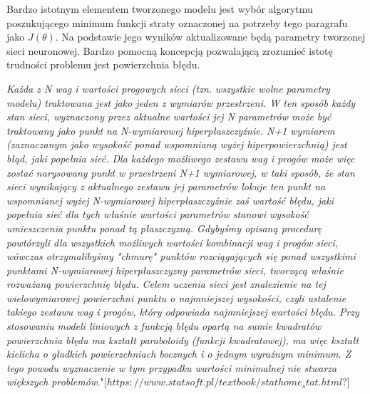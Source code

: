 \documentclass[]{article}
\theoremstyle{definition}
\begin{document}

Bardzo istotnym elementem tworzonego modelu jest wybór algorytmu poszukującego minimum funkcji straty oznaczonej na potrzeby tego paragrafu jako $J(\theta)$. Na podstawie jego wyników aktualizowane będą parametry tworzonej sieci neuronowej. Bardzo pomocną koncepcją pozwalającą zrozumieć istotę trudności problemu jest powierzchnia błędu.

\textit{Każda z N wag i wartości progowych sieci (tzn. wszystkie wolne parametry modelu) traktowana jest jako jeden z wymiarów przestrzeni. W ten sposób każdy stan sieci, wyznaczony przez aktualne wartości jej N parametrów może być traktowany jako punkt na N-wymiarowej hiperpłaszczyźnie. N+1 wymiarem (zaznaczanym jako wysokość ponad wspomnianą wyżej hiperpowierzchnią) jest błąd, jaki popełnia sieć. Dla każdego możliwego zestawu wag i progów może więc zostać narysowany punkt w przestrzeni N+1 wymiarowej, w taki sposób, że stan sieci wynikający z aktualnego zestawu jej parametrów lokuje ten punkt na wspomnianej wyżej N-wymiarowej hiperpłaszczyźnie zaś wartość błędu, jaki popełnia sieć dla tych właśnie wartości parametrów stanowi wysokość umieszczenia punktu ponad tą płaszczyzną. Gdybyśmy opisaną procedurę powtórzyli dla wszystkich możliwych wartości kombinacji wag i progów sieci, wówczas otrzymalibyśmy "chmurę" punktów rozciągających się ponad wszystkimi punktami N-wymiarowej hiperpłaszczyzny parametrów sieci, tworzącą właśnie rozważaną powierzchnię błędu. Celem uczenia sieci jest znalezienie na tej wielowymiarowej powierzchni punktu o najmniejszej wysokości, czyli ustalenie takiego zestawu wag i progów, który odpowiada najmniejszej wartości błędu.
Przy stosowaniu modeli liniowych z funkcją błędu opartą na sumie kwadratów powierzchnia błędu ma kształt paraboloidy (funkcji kwadratowej), ma więc kształt kielicha o gładkich powierzchniach bocznych i o jednym wyraźnym minimum. Z tego powodu wyznaczenie w tym przypadku wartości minimalnej nie stwarza większych problemów.}"[$https://www.statsoft.pl/textbook/stathome_stat.html?$]
\end{document}
